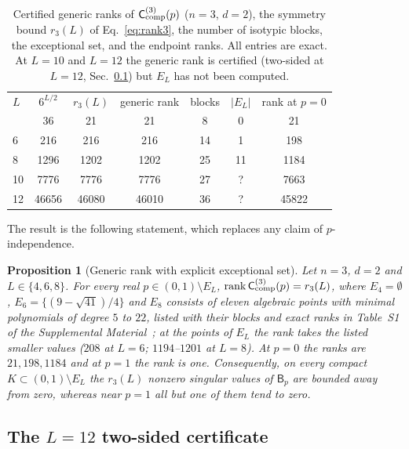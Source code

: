 \documentclass[aps,prx,reprint,superscriptaddress,nobibnotes,longbibliography]{revtex4-2}
\newtheorem{proposition}{Proposition}
\theoremstyle{remark}
\newcommand{\rk}{\operatorname{rank}}
\newcommand{\Ccomp}{\mathsf C_{\rm comp}}
\begin{document}
\begin{table}[t]
\caption{Certified generic ranks of $\Ccomp^{(3)}(p)$ ($n=3$, $d=2$), the symmetry bound $r_3(L)$ of Eq.~\eqref{eq:rank3}, the number of isotypic blocks, the exceptional set, and the endpoint ranks.  All entries are exact.  At $L=10$ and $L=12$ the generic rank is certified (two-sided at $L=12$, Sec.~\ref{app:L12}) but $E_L$ has not been computed.}
\label{tab:rank3}
\begin{ruledtabular}
\begin{tabular}{lcccccc}
$L$ & $6^{L/2}$ & $r_3(L)$ & generic rank & blocks & $|E_L|$ & rank at $p=0$\\
\colrule
4 & 36 & 21 & 21 & 8 & 0 & 21\\
6 & 216 & 216 & 216 & 14 & 1 & 198\\
8 & 1296 & 1202 & 1202 & 25 & 11 & 1184\\
10 & 7776 & 7776 & 7776 & 27 & ? & 7663\\
12 & 46656 & 46080 & 46010 & 36 & ? & 45822\\
\end{tabular}
\end{ruledtabular}
\end{table}

The result is the following statement, which replaces any claim of $p$-independence.

\begin{proposition}[Generic rank with explicit exceptional set]
\label{prop:rank3}
Let $n=3$, $d=2$ and $L\in\{4,6,8\}$.  For every real $p\in(0,1)\setminus E_L$, $\rk\Ccomp^{(3)}(p)=r_3(L)$, where $E_4=\emptyset$, $E_6=\{(9-\sqrt{41})/4\}$ and $E_8$ consists of eleven algebraic points with minimal polynomials of degree $5$ to $22$, listed with their blocks and exact ranks in Table~S1 of the Supplemental Material~\cite{SM}; at the points of $E_L$ the rank takes the listed smaller values ($208$ at $L=6$; $1194$--$1201$ at $L=8$).  At $p=0$ the ranks are $21,198,1184$ and at $p=1$ the rank is one.  Consequently, on every compact $K\subset(0,1)\setminus E_L$ the $r_3(L)$ nonzero singular values of $\mathsf B_p$ are bounded away from zero, whereas near $p=1$ all but one of them tend to zero.
\end{proposition}

\subsection{The $L=12$ two-sided certificate}
\label{app:L12}
\end{document}
